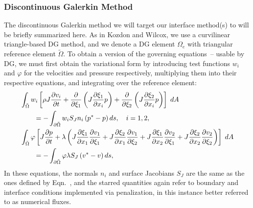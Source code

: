 \subsubsection{Discontinuous Galerkin Method}

The discontinuous Galerkin method we will target our interface method(s) to
will be briefly summarized here. As in Kozdon and Wilcox, we use a curvilinear
triangle-based DG method, and we denote a DG element $\Omega_e$ with triangular
reference element $\tilde{\Omega}$. To obtain a version of the governing equations~--
usable by DG, we must first obtain the variational
form by introducing test functions $w_{i}$ and $\varphi$ for the velocities and pressure
respectively, multiplying them into their respective equations, and integrating over
the reference element:
\begin{align}
  \notag
  &\int_{\tilde{\Omega}} w_{i}\left[\rho J \frac{\partial v_{i}}{\partial t}
  + \frac{\partial}{\partial \xi_{1}}\left(J\frac{\partial \xi_{1}}{\partial x_{i}} p\right)
  + \frac{\partial}{\partial \xi_{2}}\left(J\frac{\partial \xi_{2}}{\partial x_{i}} p\right)\right]\;dA\\
  \label{eq:wave1_var}
  &\qquad=
  -\int_{\partial \tilde{\Omega}} w_{i} S_{J} n_{i} \left( p^* - p\right)ds,
  \quad i=1,2,\\
  \notag
  &\int_{\tilde{\Omega}}
  \varphi \left[J\frac{\partial p}{\partial t} + \lambda\left(
    J\frac{\partial \xi_{1}}{\partial x_{1}} \frac{\partial v_{1}}{\partial \xi_{1}}
  + J\frac{\partial \xi_{2}}{\partial x_{1}} \frac{\partial v_{1}}{\partial \xi_{2}}
  + J\frac{\partial \xi_{1}}{\partial x_{2}} \frac{\partial v_{2}}{\partial \xi_{1}}
  + J\frac{\partial \xi_{2}}{\partial x_{2}} \frac{\partial v_{2}}{\partial \xi_{2}}\right)\right]\;dA\\
  \label{eq:wave2_var}
  &\qquad=
  -\int_{\partial \tilde{\Omega}} \varphi\lambda S_{J}
  \left(v^*-v\right) ds,
\end{align}
In these equations, the normals $n_{i}$ and surface Jacobians $S_{J}$ are the same
as the ones defined by Eqn.~, and the starred
quantities again refer to boundary and interface conditions implemented via penalization,
in this instance better referred to as numerical fluxes.
